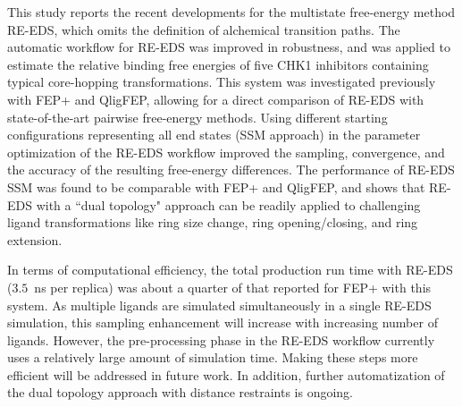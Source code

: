This study reports the recent developments for the multistate free-energy method RE-EDS, which omits the definition of alchemical transition paths. The automatic workflow for RE-EDS was improved in robustness, and was applied to estimate the relative binding free energies of five CHK1 inhibitors containing typical core-hopping transformations. This system was investigated previously with FEP+ and QligFEP, allowing for a direct comparison of RE-EDS with state-of-the-art pairwise free-energy methods.
Using different starting configurations representing all end states (SSM approach) in the parameter optimization of the RE-EDS workflow improved the sampling, convergence, and the accuracy of the resulting free-energy differences. The performance of RE-EDS SSM was found to be comparable with FEP+ and QligFEP, and shows that RE-EDS with a ``dual topology" approach can be readily applied to challenging ligand transformations like ring size change, ring opening/closing, and ring extension.

In terms of computational efficiency, the total production run time with RE-EDS ($3.5$~ns per replica) was about a quarter of that reported for FEP+ with this system. As multiple ligands are simulated simultaneously in a single RE-EDS simulation, this sampling enhancement will increase with increasing number of ligands. 
However, the pre-processing phase in the RE-EDS workflow currently uses a relatively large amount of simulation time. Making these steps more efficient will be addressed in future work. In addition, further automatization of the dual topology approach with distance restraints is ongoing.
